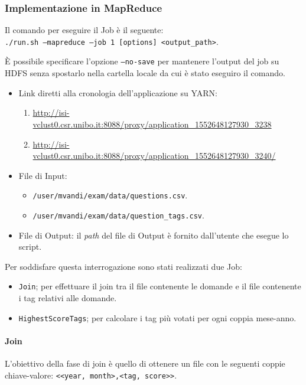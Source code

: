 \documentclass[10pt]{article}
\begin{document}
\subsubsection{Implementazione in MapReduce}
Il comando per eseguire il Job è il seguente:\\
\texttt{./run.sh --mapreduce --job 1 [options] <output\_path>}.

\`E possibile specificare l'opzione \texttt{--no-save} per mantenere l'output del job su HDFS senza spostarlo nella cartella locale da cui è stato eseguiro il comando.

\begin{itemize}
\item Link diretti alla cronologia dell'applicazione su YARN:
\begin{enumerate}
    \item \url{http://isi-vclust0.csr.unibo.it:8088/proxy/application_1552648127930_3238}
    \item \url{http://isi-vclust0.csr.unibo.it:8088/proxy/application_1552648127930_3240/}
\end{enumerate}
\item File di Input:
\begin{itemize}
\item \texttt{/user/mvandi/exam/data/questions.csv}.
\item \texttt{/user/mvandi/exam/data/question\_tags.csv}.
\end{itemize}
\item File di Output: il \textit{path} del file di Output è fornito dall'utente che esegue lo script.
\end{itemize}

Per soddisfare questa interrogazione sono stati realizzati due Job:

\begin{itemize}
    \item \texttt{Join}; per effettuare il join tra il file contenente le domande e il file contenente i tag relativi alle domande.
    \item \texttt{HighestScoreTags}; per calcolare i tag più votati per ogni coppia mese-anno.
\end{itemize}

\paragraph{Join}

L'obiettivo della fase di join è quello di ottenere un file con le seguenti coppie chiave-valore: \texttt{<<year, month>,<tag, score>>}.
\end{document}
